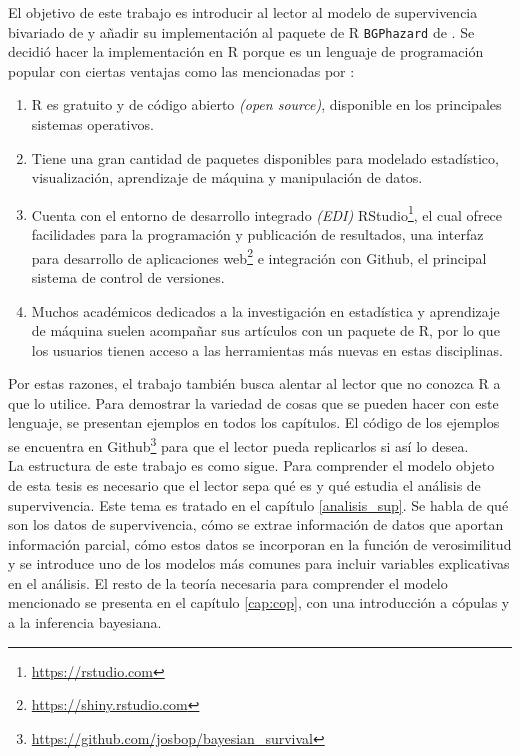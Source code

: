 \documentclass[11pt,a4paper]{article}
\begin{document}
El objetivo de este trabajo es introducir al lector al modelo de supervivencia bivariado de \citet{nieto} y añadir su implementación al paquete de R \texttt{BGPhazard} de \citet{bgphazard}. Se decidió hacer la implementación en R porque es un lenguaje de programación popular con ciertas ventajas como las mencionadas por \citet{advanced_r}:
\begin{enumerate}
\item R es gratuito y de código abierto \textit{(open source)}, disponible en los principales sistemas operativos.
\item Tiene una gran cantidad de paquetes disponibles para modelado estadístico, visualización, aprendizaje de máquina y manipulación de datos.
\item Cuenta con el entorno de desarrollo integrado \textit{(EDI)} RStudio\footnote{\url{https://rstudio.com}}, el cual ofrece facilidades para la programación y publicación de resultados, una interfaz para desarrollo de aplicaciones web\footnote{\url{https://shiny.rstudio.com}} e integración con Github, el principal sistema de control de versiones.
\item Muchos académicos dedicados a la investigación en estadística y aprendizaje de máquina suelen acompañar sus artículos con un paquete de R, por lo que los usuarios tienen acceso a las herramientas más nuevas en estas disciplinas.
\end{enumerate}
Por estas razones, el trabajo también busca alentar al lector que no conozca R a que lo utilice. Para demostrar la variedad de cosas que se pueden hacer con este lenguaje, se presentan ejemplos en todos los capítulos. El código de los ejemplos se encuentra en Github\footnote{\url{https://github.com/josbop/bayesian_survival}} para que el lector pueda replicarlos si así lo desea.\\

La estructura de este trabajo es como sigue. Para comprender el modelo objeto de esta tesis \citep{nieto} es necesario que el lector sepa qué es y qué estudia el análisis de supervivencia. Este tema es tratado en el capítulo \ref{analisis_sup}. Se habla de qué son los datos de supervivencia, cómo se extrae información de datos que aportan información parcial, cómo estos datos se incorporan en la función de verosimilitud y se introduce uno de los modelos más comunes para incluir variables explicativas en el análisis. El resto de la teoría necesaria para comprender el modelo mencionado se presenta en el capítulo \ref{cap:cop}, con una introducción a cópulas y a la inferencia bayesiana.\\
\end{document}
